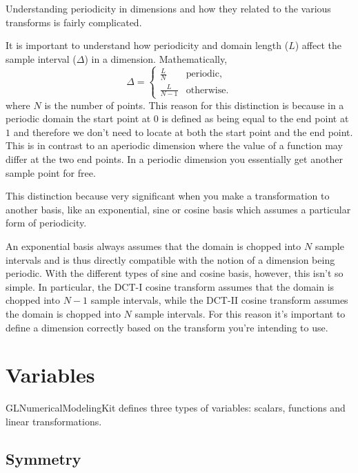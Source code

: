 \documentclass[11pt]{article}
\begin{document}
Understanding periodicity in dimensions and how they related to the various transforms is fairly complicated.

It is important to understand how periodicity and domain length ($L$) affect the sample interval ($\Delta$) in a dimension. Mathematically,
\begin{equation}
\Delta =
\begin{cases}
\frac{L}{N}      	& \text{periodic}, \\
\frac{L}{N-1}       & \text{otherwise}.
\end{cases}
\end{equation}
where $N$ is the number of points. This reason for this distinction is because in a periodic domain the start point at $0$ is defined as being equal to the end point at $1$ and therefore we don't need to locate at both the start point and the end point. This is in contrast to an aperiodic dimension where the value of a function may differ at the two end points. In a periodic dimension you essentially get another sample point for free.

This distinction because very significant when you make a transformation to another basis, like an exponential, sine or cosine basis which assumes a particular form of periodicity.

An exponential basis always assumes that the domain is chopped into $N$ sample intervals and is thus directly compatible with the notion of a dimension being periodic. With the different types of sine and cosine basis, however, this isn't so simple. In particular, the DCT-I cosine transform assumes that the domain is chopped into $N-1$ sample intervals, while the DCT-II cosine transform assumes the domain is chopped into $N$ sample intervals. For this reason it's important to define a dimension correctly based on the transform you're intending to use.

%
%
\section{Variables}

GLNumericalModelingKit defines three types of variables: scalars, functions and linear transformations. 

\subsection{Symmetry}
\end{document}
